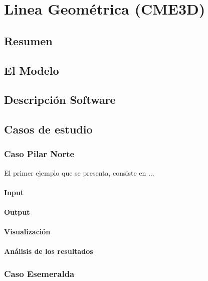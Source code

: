 \chapter{Linea  Geom\'etrica (CME3D) }

\section{Resumen}

\section{El Modelo}

\section{Descripci\'on Software}


\section{Casos de estudio}

\subsection{Caso Pilar Norte}


El primer ejemplo que se presenta, consiste en ...


\subsubsection{Input}

\subsubsection{Output}

\subsubsection{Visualizaci\'on}

\subsubsection{An\'alisis de los resultados}

\subsection{Caso Esemeralda}


